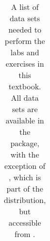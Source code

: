 \begin{table}[htbp]
\begin{tabular}{ll}
        \bottomrule
    \end{tabular}
    \caption{A list of data sets needed to perform the labs and exercises in this textbook. All data sets are available in the  package, with the exception of , which is part of the  distribution, but accessible from .}\label{tab:data_sets}
\end{table}